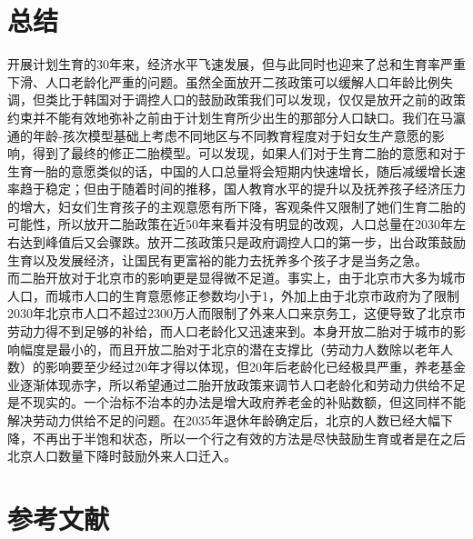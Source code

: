 \documentclass[a4paper]{article}
\begin{document}
\part{总结}
开展计划生育的30年来，经济水平飞速发展，但与此同时也迎来了总和生育率严重下滑、人口老龄化严重的问题。虽然全面放开二孩政策可以缓解人口年龄比例失调，但类比于韩国对于调控人口的鼓励政策我们可以发现，仅仅是放开之前的政策约束并不能有效地弥补之前由于计划生育所少出生的那部分人口缺口。我们在马瀛通的年龄-孩次模型基础上考虑不同地区与不同教育程度对于妇女生产意愿的影响，得到了最终的修正二胎模型。可以发现，如果人们对于生育二胎的意愿和对于生育一胎的意愿类似的话，中国的人口总量将会短期内快速增长，随后减缓增长速率趋于稳定；但由于随着时间的推移，国人教育水平的提升以及抚养孩子经济压力的增大，妇女们生育孩子的主观意愿有所下降，客观条件又限制了她们生育二胎的可能性，所以放开二胎政策在近50年来看并没有明显的改观，人口总量在2030年左右达到峰值后又会骤跌。放开二孩政策只是政府调控人口的第一步，出台政策鼓励生育以及发展经济，让国民有更富裕的能力去抚养多个孩子才是当务之急。\\
\indent
而二胎开放对于北京市的影响更是显得微不足道。事实上，由于北京市大多为城市人口，而城市人口的生育意愿修正参数均小于1，外加上由于北京市政府为了限制2030年北京市人口不超过2300万人而限制了外来人口来京务工，这便导致了北京市劳动力得不到足够的补给，而人口老龄化又迅速来到。本身开放二胎对于城市的影响幅度是最小的，而且开放二胎对于北京的潜在支撑比（劳动力人数除以老年人数）的影响要至少经过20年才得以体现，但20年后老龄化已经极具严重，养老基金业逐渐体现赤字，所以希望通过二胎开放政策来调节人口老龄化和劳动力供给不足是不现实的。一个治标不治本的办法是增大政府养老金的补贴数额，但这同样不能解决劳动力供给不足的问题。在2035年退休年龄确定后，北京的人数已经大幅下降，不再出于半饱和状态，所以一个行之有效的方法是尽快鼓励生育或者是在之后北京人口数量下降时鼓励外来人口迁入。

\part*{参考文献}
\end{document}

